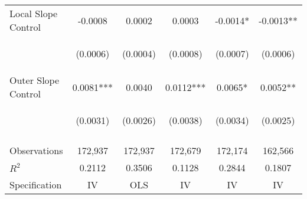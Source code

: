 \begin{tabular}{lccccc}
Local Slope Control & -0.0008 & 0.0002 & 0.0003 & -0.0014* & -0.0013** \\
\vspace{4pt} & \begin{footnotesize}(0.0006)\end{footnotesize} & \begin{footnotesize}(0.0004)\end{footnotesize} & \begin{footnotesize}(0.0008)\end{footnotesize} & \begin{footnotesize}(0.0007)\end{footnotesize} & \begin{footnotesize}(0.0006)\end{footnotesize} \\
Outer Slope Control & 0.0081*** & 0.0040 & 0.0112*** & 0.0065* & 0.0052** \\
 & \begin{footnotesize}(0.0031)\end{footnotesize} & \begin{footnotesize}(0.0026)\end{footnotesize} & \begin{footnotesize}(0.0038)\end{footnotesize} & \begin{footnotesize}(0.0034)\end{footnotesize} & \begin{footnotesize}(0.0025)\end{footnotesize} \\
\vspace{4pt} & \begin{footnotesize}\end{footnotesize} & \begin{footnotesize}\end{footnotesize} & \begin{footnotesize}\end{footnotesize} & \begin{footnotesize}\end{footnotesize} & \begin{footnotesize}\end{footnotesize} \\
Observations & 172,937 & 172,937 & 172,679 & 172,174 & 162,566 \\
$R^2$ & 0.2112 & 0.3506 & 0.1128 & 0.2844 & 0.1807 \\
Specification & IV & OLS & IV & IV & IV \\

\end{tabular}
